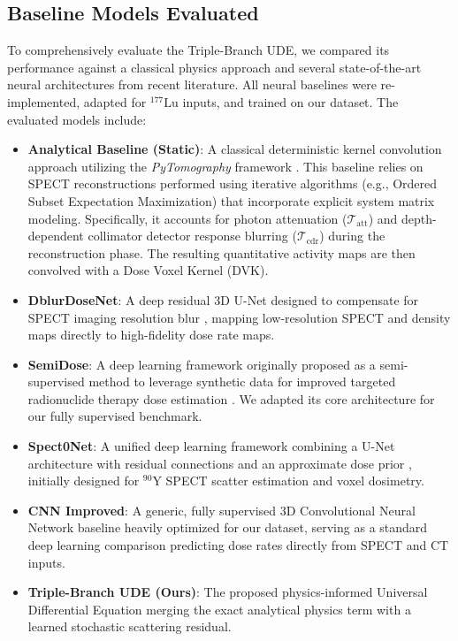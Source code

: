 \documentclass[10pt,letterpaper]{article}
\begin{document}
\subsection*{Baseline Models Evaluated}
To comprehensively evaluate the Triple-Branch UDE, we compared its performance against a classical physics approach and several state-of-the-art neural architectures from recent literature. All neural baselines were re-implemented, adapted for $^{177}\mathrm{Lu}$ inputs, and trained on our dataset. The evaluated models include:
\begin{itemize}
    \item \textbf{Analytical Baseline (Static)}: A classical deterministic kernel convolution approach utilizing the \textit{PyTomography} framework \cite{PyTomography2024}. This baseline relies on SPECT reconstructions performed using iterative algorithms (e.g., Ordered Subset Expectation Maximization) that incorporate explicit system matrix modeling. Specifically, it accounts for photon attenuation ($\mathcal{T}_{\text{att}}$) and depth-dependent collimator detector response blurring ($\mathcal{T}_{\text{cdr}}$) during the reconstruction phase. The resulting quantitative activity maps are then convolved with a Dose Voxel Kernel (DVK).
    \item \textbf{DblurDoseNet}: A deep residual 3D U-Net designed to compensate for SPECT imaging resolution blur \cite{DblurDoseNet2023}, mapping low-resolution SPECT and density maps directly to high-fidelity dose rate maps.
    \item \textbf{SemiDose}: A deep learning framework originally proposed as a semi-supervised method to leverage synthetic data for improved targeted radionuclide therapy dose estimation \cite{SemiDose2025}. We adapted its core architecture for our fully supervised benchmark.
    \item \textbf{Spect0Net}: A unified deep learning framework combining a U-Net architecture with residual connections and an approximate dose prior \cite{Spect0Net2023}, initially designed for $^{90}\mathrm{Y}$ SPECT scatter estimation and voxel dosimetry.
    \item \textbf{CNN Improved}: A generic, fully supervised 3D Convolutional Neural Network baseline heavily optimized for our dataset, serving as a standard deep learning comparison predicting dose rates directly from SPECT and CT inputs.
    \item \textbf{Triple-Branch UDE (Ours)}: The proposed physics-informed Universal Differential Equation merging the exact analytical physics term with a learned stochastic scattering residual.
\end{itemize}
\end{document}
